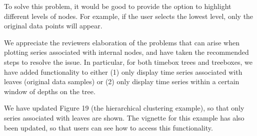 \documentclass{article}
\begin{document}
To solve this problem, it would be good to provide the option to highlight
different levels of nodes. For example, if the user selects the lowest level,
only the original data points will appear.

\color{black}
We appreciate the reviewers elaboration of the problems that can arise when
plotting series associated with internal nodes, and have taken the recommended
steps to resolve the issue. In particular, for both timebox trees and treeboxes,
we have added functionality to either (1) only display time series associated
with leaves (original data samples) or (2) only display time series within a
certain window of depths on the tree.

We have updated Figure 19 (the hierarchical clustering example), so that only
series associated with leaves are shown. The vignette for this example has also
been updated, so that users can see how to access this functionality.
\end{document}
